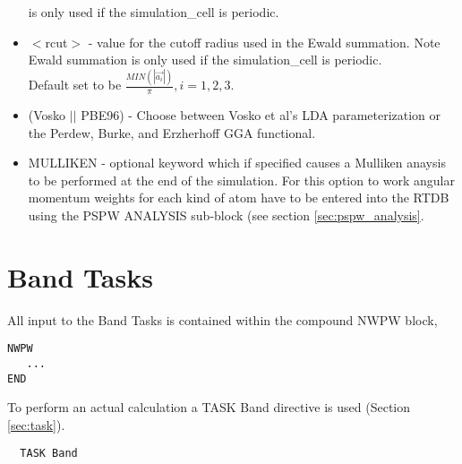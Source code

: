 \begin{itemize}
                          is only used if the simulation\_cell is periodic.
        \item $<$rcut$>$ - value for the cutoff radius used
                          in the Ewald summation. Note Ewald summation
                          is only used if the simulation\_cell is periodic. \\
                           Default set to be
                          $\frac{MIN(\left| \vec{a_i} \right|)}{\pi}, i=1,2,3$.
        \item (Vosko $||$ PBE96) - Choose between Vosko et al's LDA 
                               parameterization or the Perdew, Burke, 
                               and Erzherhoff GGA functional.
        \item MULLIKEN - optional keyword which if specified
                         causes a Mulliken anaysis to be performed at
                         the end of the simulation.  For this option
                         to work angular momentum weights for each kind
                         of atom have to be entered into the RTDB using
                         the PSPW ANALYSIS sub-block (see section \ref{sec:pspw_analysis}.
\end{itemize}




\section{Band Tasks}
\label{sec:band_tasks}

All input to the Band Tasks is contained within the compound NWPW block,
\begin{verbatim}
NWPW
   ...
END
\end{verbatim}

To perform an actual calculation a TASK Band directive is used (Section \ref{sec:task}).  
\begin{verbatim}
  TASK Band
\end{verbatim} 


